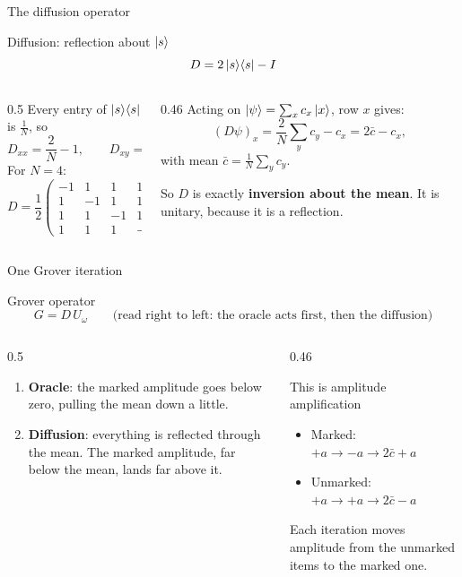 \documentclass[aspectratio=169,11pt]{beamer}
\newcommand{\hl}[1]{{\color{qorange}\textbf{#1}}}
\newcommand{\key}[1]{{\color{qdark}\textbf{#1}}}
\newcommand{\Uo}{U_\omega}
\newcommand{\pj}[1]{\ket{#1}\!\bra{#1}}
\begin{document}
\begin{frame}{The diffusion operator}
  \begin{block}{Diffusion: reflection about $\ket{s}$}
    \[ D = 2\pj{s} - I \]
  \end{block}
  \begin{columns}[T]
    \begin{column}{0.5\textwidth}
      Every entry of $\pj{s}$ is $\frac1N$, so
      \[ D_{xx} = \frac2N - 1, \qquad D_{xy} = \frac2N\ (x \ne y). \]
      For $N = 4$:
      \[ D = \frac12\begin{pmatrix}-1&1&1&1\\1&-1&1&1\\1&1&-1&1\\1&1&1&-1\end{pmatrix} \]
    \end{column}
    \begin{column}{0.46\textwidth}
      Acting on $\ket\psi = \sum_xc_x\ket{x}$, row $x$ gives:
      \[ (D\psi)_x = \frac2N\sum_yc_y - c_x = 2\bar c - c_x, \]
      with mean $\bar c = \frac1N\sum_yc_y$.
      \begin{alertblock}{So}
        $D$ is exactly \hl{inversion about the mean}. It is unitary, because it is a reflection.
      \end{alertblock}
    \end{column}
  \end{columns}
\end{frame}

\begin{frame}{One Grover iteration}
  \begin{block}{Grover operator}
    \[ G = D\,\Uo \qquad\text{(read right to left: the oracle acts first, then the diffusion)} \]
  \end{block}
  \begin{columns}[T]
    \begin{column}{0.5\textwidth}
      \begin{enumerate}
        \item \key{Oracle}: the marked amplitude goes below zero, pulling the mean down a little.
        \item \key{Diffusion}: everything is reflected through the mean. The marked amplitude, far below the mean, lands far above it.
      \end{enumerate}
    \end{column}
    \begin{column}{0.46\textwidth}
      \begin{exampleblock}{This is amplitude amplification}
        \begin{itemize}
          \item Marked: $+a \to -a \to 2\bar c + a$
          \item Unmarked: $+a \to +a \to 2\bar c - a$
        \end{itemize}
        Each iteration moves amplitude from the unmarked items to the marked one.
      \end{exampleblock}
    \end{column}
  \end{columns}
\end{frame}
\end{document}
